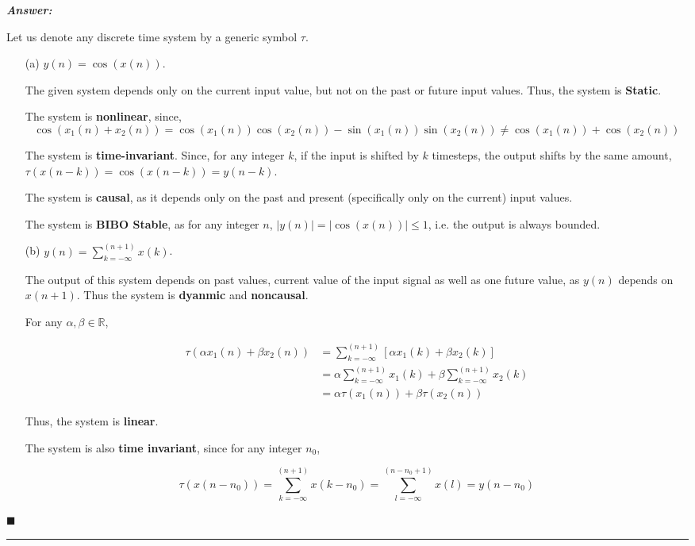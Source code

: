 \documentclass[12pt]{article}
\theoremstyle{definition}
\newenvironment{answer}{
    \textbf{\textit{Answer:}} \qquad
}{\hfill $\blacksquare$ \\ \begin{center}
    \rule{0.6\linewidth}{0.5px}    
\end{center}
}
\newcommand{\R}{\mathbb{R}}
\begin{document}
\begin{answer}
    Let us denote any discrete time system by a generic symbol $\tau$. 
    \begin{enumerate}
        \item[(a)] $y(n) = \cos(x(n))$.
        
        The given system depends only on the current input value, but not on the past or future input values. Thus, the system is \textbf{Static}.

        The system is \textbf{nonlinear}, since,
        $$
        \cos(x_1(n) + x_2(n)) = \cos(x_1(n))\cos(x_2(n)) - \sin(x_1(n)) \sin(x_2(n)) \neq \cos(x_1(n)) + \cos(x_2(n)) 
        $$

        The system is \textbf{time-invariant}. Since, for any integer $k$, if the input is shifted by $k$ timesteps, the output shifts by the same amount, $\tau(x(n-k)) = \cos(x(n-k)) = y(n-k)$.

        The system is \textbf{causal}, as it depends only on the past and present (specifically only on the current) input values.

        The system is \textbf{BIBO Stable}, as for any integer $n$, $\vert y(n)\vert = \vert \cos(x(n)) \vert \leq 1$, i.e. the output is always bounded.


        \item[(b)] $y(n) = \sum_{k = -\infty}^{(n+1)}x(k)$.
         
        The output of this system depends on past values, current value of the input signal as well as one future value, as $y(n)$ depends on $x(n+1)$. Thus the system is \textbf{dyanmic} and \textbf{noncausal}.

        For any $\alpha, \beta \in \R$,

        \begin{align*}
            \tau(\alpha x_1(n) + \beta x_2(n))
            & = \sum_{k = -\infty}^{(n+1)} \left[ \alpha x_1(k) + \beta x_2(k) \right]\\
            & = \alpha \sum_{k = -\infty}^{(n+1)} x_1(k) + \beta \sum_{k = -\infty}^{(n+1)} x_2(k)\\
            & = \alpha \tau(x_1(n)) + \beta \tau(x_2(n))
        \end{align*}

        Thus, the system is \textbf{linear}.

        The system is also \textbf{time invariant}, since for any integer $n_0$,

        $$
        \tau(x(n-n_0)) = \sum_{k = -\infty}^{(n + 1)} x(k-n_0) =\sum_{l = -\infty}^{(n - n_0 + 1)} x(l) = y(n-n_0) 
        $$


\end{enumerate}
\end{answer}
\end{document}
